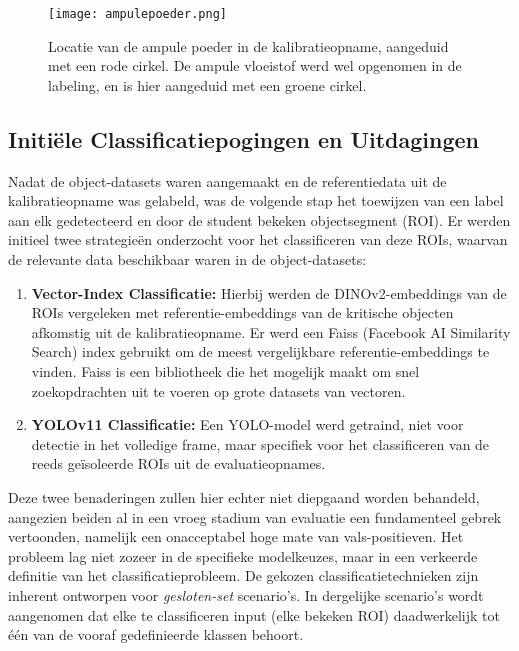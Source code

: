 \begin{figure}[H]
    \centering
    \texttt{[image: ampulepoeder.png]}
    \caption[Voorbeeld van de ampule poeder in de kalibratieopname]{
        \label{fig:ampulepoeder}
        Locatie van de ampule poeder in de kalibratieopname, aangeduid met een rode cirkel.
        De ampule vloeistof werd wel opgenomen in de labeling, en is hier aangeduid met een groene cirkel.
    }
\end{figure}

\subsection{Initiële Classificatiepogingen en Uitdagingen}

Nadat de object-datasets waren aangemaakt en de referentiedata uit de kalibratieopname was gelabeld, was de volgende stap het 
toewijzen van een label aan elk gedetecteerd en door de student bekeken objectsegment (ROI). 
Er werden initieel twee strategieën onderzocht voor het classificeren van deze ROIs, waarvan de relevante data beschikbaar waren in de object-datasets:
\begin{enumerate}
    \item \textbf{Vector-Index Classificatie:} Hierbij werden de DINOv2-embeddings van de ROIs vergeleken met referentie-embeddings van de kritische objecten afkomstig uit de kalibratieopname.
    Er werd een Faiss (Facebook AI Similarity Search) index gebruikt om de meest vergelijkbare referentie-embeddings te vinden.
    Faiss is een bibliotheek die het mogelijk maakt om snel zoekopdrachten uit te voeren op grote datasets van vectoren.
    \item \textbf{YOLOv11 Classificatie:} Een YOLO-model werd getraind, niet voor detectie in het volledige frame, maar specifiek voor het classificeren van de reeds 
    geïsoleerde ROIs uit de evaluatieopnames.
\end{enumerate}

Deze twee benaderingen zullen hier echter niet diepgaand worden behandeld, 
aangezien beiden al in een vroeg stadium van evaluatie een fundamenteel gebrek vertoonden, 
namelijk een onacceptabel hoge mate van vals-positieven. 
Het probleem lag niet zozeer in de specifieke modelkeuzes, maar in een verkeerde definitie van het classificatieprobleem.
De gekozen classificatietechnieken zijn inherent ontworpen voor \textit{gesloten-set} scenario's. 
In dergelijke scenario's  wordt aangenomen dat elke te classificeren input (elke bekeken ROI)
daadwerkelijk tot één van de vooraf gedefinieerde klassen behoort. 

